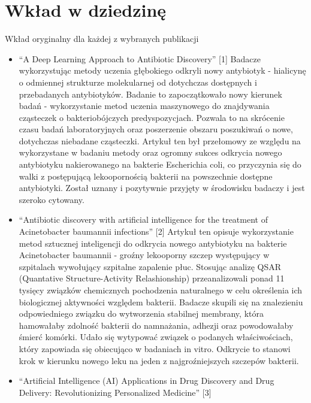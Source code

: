 \section{Wkład w dziedzinę}
Wkład oryginalny dla każdej z wybranych publikacji
    \begin{itemize}
        \item “A Deep Learning Approach to Antibiotic Discovery” [1] 
Badacze wykorzystując metody uczenia głębokiego odkryli nowy antybiotyk - hialicynę o odmiennej strukturze molekularnej od dotychczas dostępnych i przebadanych antybiotyków. Badanie to zapoczątkowało nowy kierunek badań - wykorzystanie metod uczenia maszynowego do znajdywania cząsteczek o bakteriobójczych predyspozycjach. Pozwala to na skrócenie czasu badań laboratoryjnych oraz poszerzenie obszaru poszukiwań o nowe, dotychczas niebadane cząsteczki. Artykuł ten był przełomowy ze względu na wykorzystane w badaniu metody oraz ogromny sukces odkrycia nowego antybiotyku nakierowanego na bakterie Escherichia coli, co przyczynia się do walki z postępującą lekoopornością bakterii na powszechnie dostępne antybiotyki. Został uznany i pozytywnie przyjęty w środowisku badaczy i jest szeroko cytowany. 
        \item “Antibiotic discovery with artificial intelligence for the treatment of Acinetobacter baumannii infections” [2] 
Artykuł ten opisuje wykorzystanie metod sztucznej inteligencji do odkrycia nowego antybiotyku na bakterie Acinetobacter baumannii - groźny lekooporny szczep występujący w szpitalach wywołujący szpitalne zapalenie płuc. Stosując analizę QSAR (Quantative Structure-Activity Relashionship) przeanalizowali ponad 11 tysięcy związków chemicznych pochodzenia naturalnego w celu określenia ich biologicznej aktywności względem bakterii. Badacze skupili się na znalezieniu odpowiedniego związku do wytworzenia stabilnej membrany, która hamowałaby zdolność bakterii do namnażania, adhezji oraz powodowałaby śmierć komórki. Udało się wytypować związek o podanych właściwościach, który zapowiada się obiecująco w badaniach in vitro. Odkrycie to stanowi krok w kierunku nowego leku na jeden z najgroźniejszych szczepów bakterii. 
        \item “Artificial Intelligence (AI) Applications in Drug Discovery and Drug Delivery: Revolutionizing Personalized Medicine” [3] 

\end{itemize}
